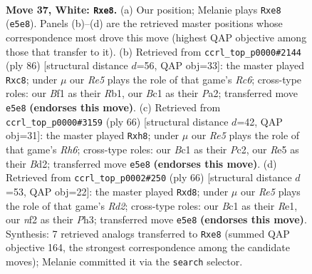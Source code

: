 \documentclass[11pt]{article}
\begin{document}
\clearpage

\begin{figure}[p]\centering
\begin{subfigure}{0.46\textwidth}\centering
\resizebox{\linewidth}{!}{%
\newchessgame
\chessboard[
  setfen={1r2r3/pb1p1pk1/8/4R1P1/8/8/PPK2n2/2B2BR1 w - - 1 37},
  showmover=false,
  pgfstyle=straightmove, color=movearrow, markmove={e5-e8}
]}
\caption{}
\end{subfigure}\hfill
\begin{subfigure}{0.46\textwidth}\centering
\resizebox{\linewidth}{!}{%
\newchessgame
\chessboard[
  setfen={2r2r2/8/2R5/1P1pk3/5b2/p2B1P2/P3K3/1R6 w - - 2 44},
  showmover=false,
  pgfstyle=straightmove, color=movearrow, markmove={c6-c8}
]}
\caption{}
\end{subfigure}
\\[4pt]
\begin{subfigure}{0.46\textwidth}\centering
\resizebox{\linewidth}{!}{%
\newchessgame
\chessboard[
  setfen={4r2r/2p2k2/7R/1p1P4/2nR1P2/8/2PB4/2K5 w - - 1 34},
  showmover=false,
  pgfstyle=straightmove, color=movearrow, markmove={h6-h8}
]}
\caption{}
\end{subfigure}\hfill
\begin{subfigure}{0.46\textwidth}\centering
\resizebox{\linewidth}{!}{%
\newchessgame
\chessboard[
  setfen={1r1r4/5pk1/4b3/7p/p7/P6P/1P1R1PB1/4R1K1 w - - 1 34},
  showmover=false,
  pgfstyle=straightmove, color=movearrow, markmove={d2-d8}
]}
\caption{}
\end{subfigure}
\caption{\textbf{Move 37, White: \texttt{Rxe8}.} (a) Our position; Melanie plays \texttt{Rxe8} (\texttt{e5e8}). Panels (b)--(d) are the retrieved master positions whose correspondence most drove this move (highest QAP objective among those that transfer to it). (b) Retrieved from \texttt{ccrl\_top\_p0000\#2144} (ply 86) [structural distance $d$=56, QAP obj=33]: the master played \texttt{Rxc8}; under $\mu$ our \emph{Re5} plays the role of that game's \emph{Rc6}; cross-type roles: our \emph{B}f1 as their \emph{R}b1, our \emph{B}c1 as their \emph{P}a2; transferred move \texttt{e5e8} \textbf{(endorses this move)}. (c) Retrieved from \texttt{ccrl\_top\_p0000\#3159} (ply 66) [structural distance $d$=42, QAP obj=31]: the master played \texttt{Rxh8}; under $\mu$ our \emph{Re5} plays the role of that game's \emph{Rh6}; cross-type roles: our \emph{B}c1 as their \emph{P}c2, our \emph{R}e5 as their \emph{B}d2; transferred move \texttt{e5e8} \textbf{(endorses this move)}. (d) Retrieved from \texttt{ccrl\_top\_p0002\#250} (ply 66) [structural distance $d$=53, QAP obj=22]: the master played \texttt{Rxd8}; under $\mu$ our \emph{Re5} plays the role of that game's \emph{Rd2}; cross-type roles: our \emph{B}c1 as their \emph{R}e1, our \emph{n}f2 as their \emph{P}h3; transferred move \texttt{e5e8} \textbf{(endorses this move)}. Synthesis: 7 retrieved analogs transferred to \texttt{Rxe8} (summed QAP objective 164, the strongest correspondence among the candidate moves); Melanie committed it via the \texttt{search} selector.}
\label{fig:thought-m72}
\end{figure}
\end{document}
